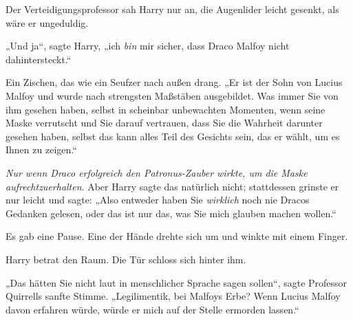 Der Verteidigungsprofessor sah Harry nur an, die Augenlider leicht gesenkt, als wäre er ungeduldig.

„Und ja“, sagte Harry, „ich \emph{bin} mir sicher, dass Draco Malfoy nicht dahintersteckt.“

Ein Zischen, das wie ein Seufzer nach außen drang. „Er ist der Sohn von Lucius Malfoy und wurde nach strengsten Maßstäben ausgebildet. Was immer Sie von ihm gesehen haben, selbst in scheinbar unbewachten Momenten, wenn seine Maske verrutscht und Sie darauf vertrauen, dass Sie die Wahrheit darunter gesehen haben, selbst das kann alles Teil des Gesichts sein, das er wählt, um es Ihnen zu zeigen.“

\emph{Nur wenn Draco erfolgreich den Patronus-Zauber wirkte, um die Maske aufrechtzuerhalten}. Aber Harry sagte das natürlich nicht; stattdessen grinste er nur leicht und sagte: „Also entweder haben Sie \emph{wirklich} noch nie Dracos Gedanken gelesen, oder das ist nur das, was Sie mich glauben machen wollen.“

Es gab eine Pause. Eine der Hände drehte sich um und winkte mit einem Finger.

Harry betrat den Raum. Die Tür schloss sich hinter ihm.

„Das hätten Sie nicht laut in menschlicher Sprache sagen sollen“, sagte Professor Quirrells sanfte Stimme. „Legilimentik, bei Malfoys Erbe? Wenn Lucius Malfoy davon erfahren würde, würde er mich auf der Stelle ermorden lassen.“

